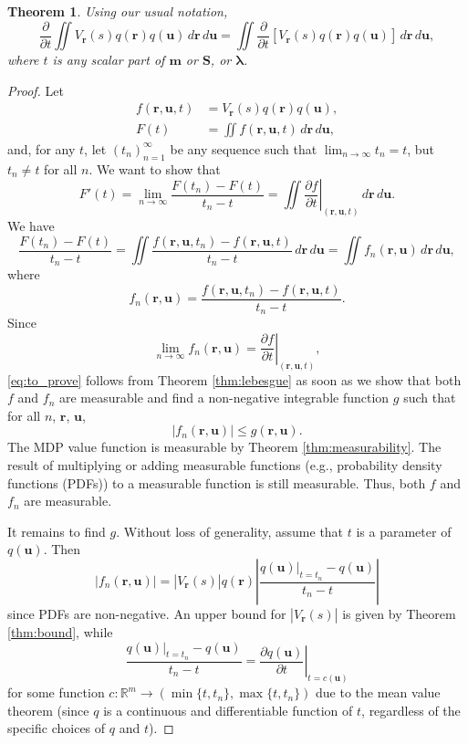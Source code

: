 \documentclass{article}
\newtheorem{theorem}{Theorem}[section]
\theoremstyle{definition}
\newcommand{\dt}{\frac{\partial}{\partial t}}
\newcommand{\f}{f(\mathbf{r}, \mathbf{u}, t)}
\newcommand{\ftn}{f(\mathbf{r}, \mathbf{u}, t_n)}
\newcommand{\fn}{f_n(\mathbf{r}, \mathbf{u})}
\newcommand{\dx}{\,d\mathbf{r}\,d\mathbf{u}}
\newcommand{\df}{\left.\frac{\partial f}{\partial t}\right|_{(\mathbf{r},
    \mathbf{u}, t)}}
\newcommand{\g}{g(\mathbf{r}, \mathbf{u})}
\begin{document}
\begin{theorem}
  Using our usual notation,
  \[ \dt\iint
    V_{\mathbf{r}}(s)q(\mathbf{r})q(\mathbf{u})\dx
    = \iint
    \dt[V_{\mathbf{r}}(s)q(\mathbf{r})q(\mathbf{u})]\dx, \]
  where $t$ is any scalar part of $\mathbf{m}$ or $\mathbf{S}$, or $\bm\lambda$.
\end{theorem}
\begin{proof}
  Let
  \begin{align*}
    \f &= V_{\mathbf{r}}(s)q(\mathbf{r})q(\mathbf{u}), \\
    F(t) &= \iint \f\dx,
  \end{align*}
  and, for any $t$, let $(t_n)_{n=1}^\infty$ be any sequence such that
  $\lim_{n \to \infty} t_n = t$, but $t_n \ne t$ for all $n$. We want to show
  that
  \begin{equation} \label{eq:to_prove}
    F'(t) = \lim_{n \to \infty} \frac{F(t_n) - F(t)}{t_n - t} = \iint \df\dx.
  \end{equation}
  We have
  \[ \frac{F(t_n) - F(t)}{t_n - t} = \iint \frac{\ftn - \f}{t_n - t}\dx =
    \iint \fn\dx, \]
  where
  \[ \fn = \frac{\ftn - \f}{t_n - t}. \]
  Since
  \[ \lim_{n \to \infty} \fn = \df, \]
  \eqref{eq:to_prove} follows from Theorem \ref{thm:lebesgue} as soon as we show
  that both $f$ and $f_n$ are measurable and find a non-negative integrable
  function $g$ such that for all $n$, $\mathbf{r}$, $\mathbf{u}$,
  \[ |\fn| \le \g. \]
  The MDP value function is measurable by Theorem \ref{thm:measurability}. The
  result of multiplying or adding measurable functions (e.g., probability
  density functions (PDFs)) to a measurable function is still measurable. Thus,
  both $f$ and $f_n$ are measurable.

  It remains to find $g$. Without loss of generality, assume that $t$ is a
  parameter of $q(\mathbf{u})$. Then
  \[ |\fn| = |V_{\mathbf{r}}(s)|q(\mathbf{r}) \left| \frac{q(\mathbf{u})|_{t =
          t_n} - q(\mathbf{u})}{t_n - t} \right| \]
  since PDFs are non-negative. An upper bound for
  $|V_{\mathbf{r}}(s)|$ is given by Theorem \ref{thm:bound}, while
  \[ \frac{q(\mathbf{u})|_{t = t_n} - q(\mathbf{u})}{t_n - t} = \left.
      \frac{\partial q(\mathbf{u})}{\partial t} \right|_{t = c(\mathbf{u})} \]
  for some function $c : \mathbb{R}^m \to (\min\{t, t_n\}, \max\{t, t_n\})$
  due to the mean value theorem (since $q$ is a continuous and differentiable
  function of $t$, regardless of the specific choices of $q$ and $t$).


\end{proof}
\end{document}
